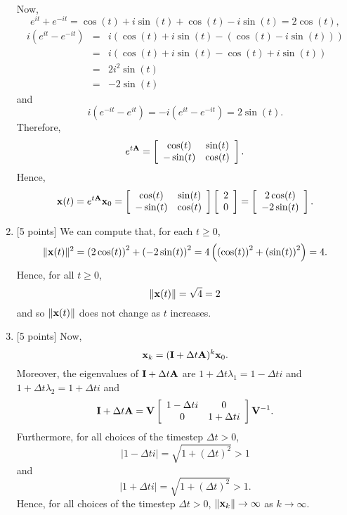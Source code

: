 \begin{solution}
\begin{enumerate}
\begin{eqnarray*}
\end{eqnarray*}
Now,
\[
e^{it} + e^{-it}=\cos(t)+i\sin(t)+\cos(t)-i\sin(t)=2\cos(t),
\]
\begin{eqnarray*}
i\left(e^{it} - e^{-it}\right)&=&i\left(\cos(t)+i\sin(t)-\left(\cos(t)-i\sin(t)\right)\right)
\\
&=&i\left(\cos(t)+i\sin(t)-\cos(t)+i\sin(t)\right)
\\
&=&2i^2\sin(t)
\\
&=&-2\sin(t)
\end{eqnarray*}
and
\[
i\left(e^{-it} - e^{it}\right)=-i\left(e^{it} - e^{-it}\right)=2\sin(t).
\]
Therefore,
\[
e^{t{\bf A}} =\left[\begin{array}{cc}\cos(t) & \sin(t) \\ -\sin(t) & \cos(t)\end{array}\right].
\]
Hence,
\[
{\bf x}(t) = e^{t{\bf A}} {\bf x}_0 = \left[\begin{array}{cc}\cos(t) & \sin(t) \\ -\sin(t) & \cos(t)\end{array}\right]\left[\begin{array}{c}2 \\ 0\end{array}\right] = \left[\begin{array}{c}2\cos(t) \\ -2\sin(t)\end{array}\right].
\]

\item {[5 points]} We can compute that, for each $t\ge0$,
\[
\|{\bf x}(t)\|^2=\left(2\cos(t)\right)^2+\left(-2\sin(t)\right)^2=4\left(\left(\cos(t)\right)^2+\left(\sin(t)\right)^2\right)=4.
\]
Hence, for all  $t\ge0$,
\[
\|{\bf x}(t)\|=\sqrt{4}=2
\]
and so $\|{\bf x}(t)\|$ does not change as $t$ increases.

\item {[5 points]} Now,
\[
{\bf x}_k = ({\bf I}+\Delta t {\bf A})^k {\bf x}_0.
\]
Moreover, the eigenvalues of ${\bf I}+\Delta t {\bf A}$ are $1+\Delta t \lambda_1 = 1-\Delta t i$ and $1+\Delta t \lambda_2 = 1+\Delta ti$ and
\[
{\bf I}+\Delta t {\bf A}={\bf V} \left[\begin{array}{cc}1-\Delta ti & 0 \\ 0 & 1+\Delta ti\end{array}\right] {\bf V}^{-1}.
\]
Furthermore, for all choices of the timestep $\Delta t>0$,
\[
\left|1-\Delta t i\right|=\sqrt{1+\left(\Delta t\right)^2}>1
\]
and
\[
\left|1+\Delta t i\right|=\sqrt{1+\left(\Delta t\right)^2}>1.
\]
Hence, for all choices of the timestep $\Delta t>0$, $\|{\bf x}_k\|\rightarrow\infty$ as $k\to\infty$.


\end{enumerate}
\end{solution}
